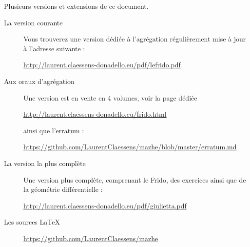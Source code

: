 

\thispagestyle{empty}

Plusieurs versions et extensions de ce document.
\begin{description}

    \item[La version courante]

        Vous trouverez une version dédiée à l'agrégation régulièrement mise à jour à l'adresse suivante :
        \begin{center}
            \url{http://laurent.claessens-donadello.eu/pdf/lefrido.pdf}
        \end{center}

    \item[Aux oraux d'agrégation]

        Une version est en vente en 4 volumes, voir la page dédiée
        \begin{center}
            \url{http://laurent.claessens-donadello.eu/frido.html}
        \end{center}
        ainsi que l'erratum :
        \begin{center}
            \url{https://github.com/LaurentClaessens/mazhe/blob/master/erratum.md}
        \end{center}

    \item[La version la plus complète]

        Une version plus complète, comprenant le Frido, des exercices ainsi que de la géométrie différentielle :
        \begin{center}
            \url{http://laurent.claessens-donadello.eu/pdf/giulietta.pdf}
        \end{center}

    \item[Les sources \LaTeX]
        \begin{center}
            \url{https://github.com/LaurentClaessens/mazhe}
        \end{center}
\end{description}
